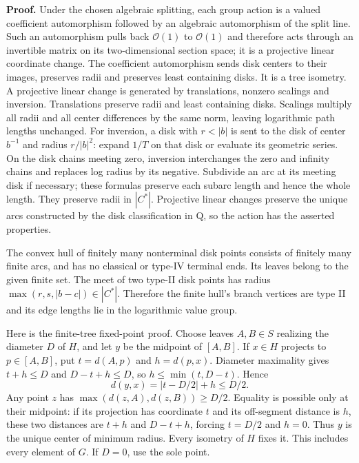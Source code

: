 \documentclass[
  11pt,
]{article}
\begin{document}
\textbf{Proof.} Under the chosen algebraic splitting, each group action
is a valued coefficient automorphism followed by an algebraic
automorphism of the split line. Such an automorphism pulls back
\(\mathcal O(1)\) to \(\mathcal O(1)\) and therefore acts through an
invertible matrix on its two-dimensional section space; it is a
projective linear coordinate change. The coefficient automorphism sends
disk centers to their images, preserves radii and preserves least
containing disks. It is a tree isometry. A projective linear change is
generated by translations, nonzero scalings and inversion. Translations
preserve radii and least containing disks. Scalings multiply all radii
and all center differences by the same norm, leaving logarithmic path
lengths unchanged. For inversion, a disk with \(r<|b|\) is sent to the
disk of center \(b^{-1}\) and radius \(r/|b|^2\): expand \(1/T\) on that
disk or evaluate its geometric series. On the disk chains meeting zero,
inversion interchanges the zero and infinity chains and replaces log
radius by its negative. Subdivide an arc at its meeting disk if
necessary; these formulas preserve each subarc length and hence the
whole length. They preserve radii in \(|C^*|\). Projective linear
changes preserve the unique arcs constructed by the disk classification
in Q, so the action has the asserted properties.

The convex hull of finitely many nonterminal disk points consists of
finitely many finite arcs, and has no classical or type-IV terminal
ends. Its leaves belong to the given finite set. The meet of two type-II
disk points has radius \(\max(r,s,|b-c|)\in|C^*|\). Therefore the finite
hull's branch vertices are type II and its edge lengths lie in the
logarithmic value group.

Here is the finite-tree fixed-point proof. Choose leaves \(A,B\in S\)
realizing the diameter \(D\) of \(H\), and let \(y\) be the midpoint of
\([A,B]\). If \(x\in H\) projects to \(p\in[A,B]\), put \(t=d(A,p)\) and
\(h=d(p,x)\). Diameter maximality gives \(t+h\leq D\) and
\(D-t+h\leq D\), so \(h\leq\min(t,D-t)\). Hence \[
d(y,x)=|t-D/2|+h\leq D/2.
\] Any point \(z\) has \(\max(d(z,A),d(z,B))\geq D/2\). Equality is
possible only at their midpoint: if its projection has coordinate \(t\)
and its off-segment distance is \(h\), these two distances are \(t+h\)
and \(D-t+h\), forcing \(t=D/2\) and \(h=0\). Thus \(y\) is the unique
center of minimum radius. Every isometry of \(H\) fixes it. This
includes every element of \(G\). If \(D=0\), use the sole point.
\end{document}
